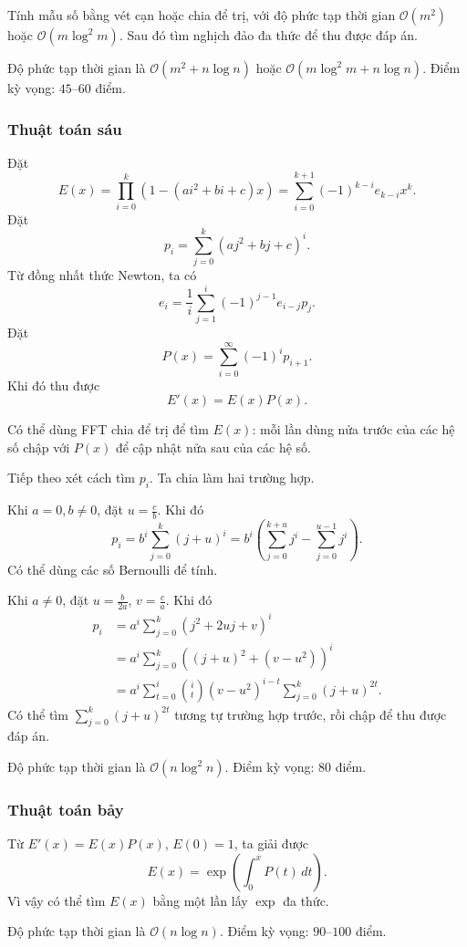 \documentclass[11pt]{article}
\newcommand{\Oh}{\mathcal{O}}
\begin{document}
Tính mẫu số bằng vét cạn hoặc chia để trị, với độ phức tạp thời gian
\(\Oh(m^2)\) hoặc \(\Oh(m\log^2 m)\). Sau đó tìm nghịch đảo đa thức để thu
được đáp án.

Độ phức tạp thời gian là \(\Oh(m^2+n\log n)\) hoặc
\(\Oh(m\log^2m+n\log n)\). Điểm kỳ vọng: \(45\)--\(60\) điểm.

\subsubsection{Thuật toán sáu}

Đặt
\[
  E(x)=\prod_{i=0}^{k}\left(1-(ai^2+bi+c)x\right)
  =\sum_{i=0}^{k+1}(-1)^{k-i}e_{k-i}x^k.
\]
Đặt
\[
  p_i=\sum_{j=0}^{k}(aj^2+bj+c)^i.
\]
Từ đồng nhất thức Newton, ta có
\[
  e_i=\frac{1}{i}\sum_{j=1}^{i}(-1)^{j-1}e_{i-j}p_j.
\]
Đặt
\[
  P(x)=\sum_{i=0}^{\infty}(-1)^i p_{i+1}.
\]
Khi đó thu được
\[
  E'(x)=E(x)P(x).
\]

Có thể dùng FFT chia để trị để tìm \(E(x)\): mỗi lần dùng nửa trước của các
hệ số chập với \(P(x)\) để cập nhật nửa sau của các hệ số.

Tiếp theo xét cách tìm \(p_i\). Ta chia làm hai trường hợp.

Khi \(a=0, b\ne 0\), đặt \(u=\frac{c}{b}\). Khi đó
\[
  p_i=b^i\sum_{j=0}^{k}(j+u)^i
  =b^i\left(\sum_{j=0}^{k+u}j^i-\sum_{j=0}^{u-1}j^i\right).
\]
Có thể dùng các số Bernoulli để tính.

Khi \(a\ne 0\), đặt \(u=\frac{b}{2a}\), \(v=\frac{c}{a}\). Khi đó
\[
\begin{aligned}
  p_i
    &=a^i\sum_{j=0}^{k}(j^2+2uj+v)^i\\
    &=a^i\sum_{j=0}^{k}\left((j+u)^2+(v-u^2)\right)^i\\
    &=a^i\sum_{t=0}^{i}\binom{i}{t}(v-u^2)^{i-t}
      \sum_{j=0}^{k}(j+u)^{2t}.
\end{aligned}
\]
Có thể tìm \(\sum_{j=0}^{k}(j+u)^{2t}\) tương tự trường hợp trước, rồi chập để
thu được đáp án.

Độ phức tạp thời gian là \(\Oh(n\log^2 n)\). Điểm kỳ vọng: \(80\) điểm.

\subsubsection{Thuật toán bảy}

Từ \(E'(x)=E(x)P(x)\), \(E(0)=1\), ta giải được
\[
  E(x)=\exp\left(\int_{0}^{x}P(t)\,dt\right).
\]
Vì vậy có thể tìm \(E(x)\) bằng một lần lấy \(\exp\) đa thức.

Độ phức tạp thời gian là \(\Oh(n\log n)\). Điểm kỳ vọng: \(90\)--\(100\) điểm.
\end{document}
